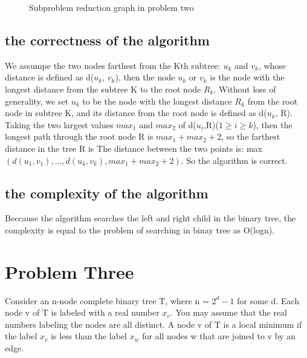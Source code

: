 \documentclass{article}
\begin{document}
\begin{CJK*}{UTF8}{gbsn}
\begin{figure}[H]
\caption{Subproblem reduction graph in problem two} 
\end{figure}

\subsection{the correctness of the algorithm}

We assumpe the two nodes farthest from the Kth subtree: $u_k$ and $v_k$, whose distance is defined as d($u_k$, $v_k$), then the node $u_k$ or $v_k$ is the node with the longest distance from the subtree K to the root node $R_k$. Without loss of generality, we set $u_k$ to be the node with the longest distance $R_k$ from the root node in subtree K, and its distance from the root node is defined as d($u_k$, R). Taking the two largest values $max_1$ and $max_2$ of d($u_i$,R)($1 \geq i \geq k$), then the longest path through the root node R is $max_1 + max_2 + 2$, so the farthest distance in the tree R is The distance between the two points is: max$(d(u_1, v_1), ..., d(u_k, v_k), max_1+max_2+2)$. So the algorithm is correct.


\subsection{the complexity of the algorithm}

Beccause the algorithm searches the left and right child in the binary tree, the complexity is equal to the problem of searching in binay tree as O(logn).

\newpage
\section{Problem Three}

Consider an n-node complete binary tree T, where n = $2^d - 1$ for some d. Each node v of T is labeled with a real number $x_v$. You may assume that the real numbers labeling the nodes are all distinct. A node v of T is a local minimum if the label $x_v$ is less than the label $x_w$ for all nodes w that are joined to v by an edge.


\end{CJK*}
\end{document}

